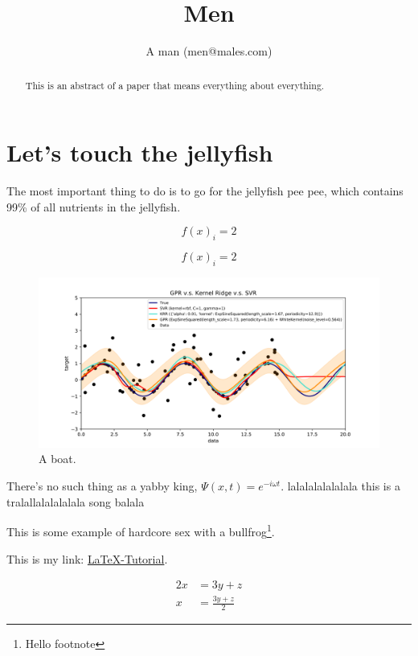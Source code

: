 \documentclass[]{article}
\title{Men}
\author{A man (men@males.com)}
\begin{document}
\maketitle

\begin{abstract}
This is an abstract of a paper that means everything about everything.
\end{abstract}
\tableofcontents
\newpage
\section{Let's touch the jellyfish}
The most important thing to do is to go for the jellyfish pee pee, which contains 99\% of all nutrients in the jellyfish.

\begin{equation}
f(x)_{i} = 2
\end{equation}

\begin{equation*}
f(x)_{i} = 2
\end{equation*}
\begin{figure}[h!]
	\includegraphics[width=\linewidth]{ims/pic3.png}
	\caption{A boat.}
	\label{fig:boat1}
\end{figure}
There's no such thing as a yabby king, $\Psi(x, t) = e^{-i\omega t}$. lalalalalalalala this is a tralallalalalalala song balala

This is some example of hardcore sex with a bullfrog\footnote{\label{myfootnote}Hello footnote}.

This is my link: \href{http://www.latex-tutorial.com}{LaTeX-Tutorial}.

\begin{align}
2x &= 3y + z\\
x &= \frac{3y + z}{2}
\end{align}
\end{document}
